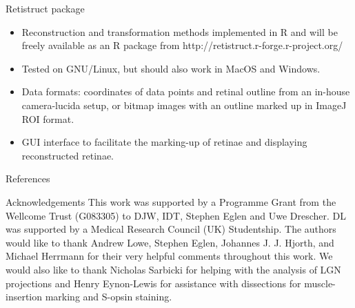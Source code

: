 \documentclass[final]{beamer}
\begin{document}
\begin{frame}{}
\begin{columns}[T]
\begin{column}{.25\linewidth}
      \begin{block}{Retistruct package}
        \begin{itemize}
        \item Reconstruction and transformation methods
          implemented in R and will be freely available as an R
          package from http://retistruct.r-forge.r-project.org/
        \item Tested on GNU/Linux, but should also work in MacOS and
          Windows.
        \item Data formats: coordinates of data points and retinal
          outline from an in-house camera-lucida setup, or bitmap
          images with an outline marked up in ImageJ ROI format.
        \item GUI interface to facilitate the marking-up of retinae
          and displaying reconstructed retinae.
        \end{itemize}
      \end{block}


      \begin{block}{\large References}
\setlength{\bibsep}{0pt}
        \newcommand{\myshortjournaltitles}{}
        
        \small
        \renewcommand{\bf}{\small\bfseries}
        
        \renewcommand{\bf}{\bfseries}
      \end{block}


      \begin{block}{\large Acknowledgements}
        \small This work was supported by a Programme Grant from the
        Wellcome Trust (G083305) to DJW, IDT, Stephen Eglen and Uwe
        Drescher. DL was supported by a Medical Research Council (UK)
        Studentship. The authors would like to thank Andrew Lowe,
        Stephen Eglen, Johannes J. J.  Hjorth, and Michael Herrmann
        for their very helpful comments throughout this work. We would
        also like to thank Nicholas Sarbicki for helping with the
        analysis of LGN projections and Henry Eynon-Lewis for
        assistance with dissections for muscle-insertion marking and
        S-opsin staining.

      \end{block}




    \end{column}



  \end{columns}



\end{frame}
\end{document}

